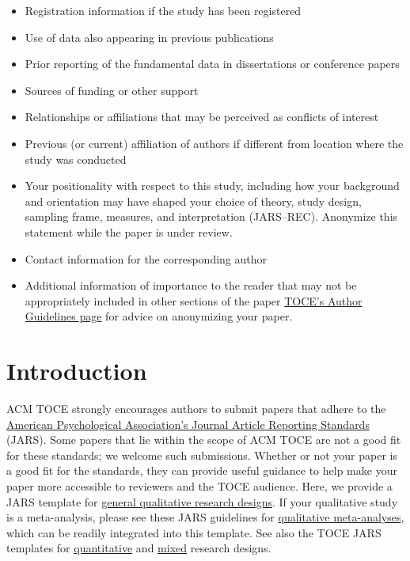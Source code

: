\documentclass[acmsmall,screen,anonymous,review]{acmart}
\begin{document}
\begin{itemize}
    \item Registration information if the study has been registered
    \item Use of data also appearing in previous publications
    \item Prior reporting of the fundamental data in dissertations or conference papers
    \item Sources of funding or other support
    \item Relationships or affiliations that may be perceived as conflicts of interest
    \item Previous (or current) affiliation of authors if different from location where the study  was conducted
    \item Your positionality with respect to this study, including how your background and orientation may have shaped your choice of theory, study design, sampling frame, measures, and interpretation (JARS--REC). Anonymize this statement while the paper is under review.
    \item Contact information for the corresponding author
    \item Additional information of importance to the reader that may not be appropriately included in other sections of the paper
    \href{https://dl.acm.org/journal/toce/author-guidelines}{TOCE’s Author Guidelines page} for advice on anonymizing your paper.
\end{itemize}

\section{Introduction}

ACM TOCE strongly encourages authors to submit papers that adhere to the \href{https://apastyle.apa.org/jars/}{American Psychological Association’s Journal Article Reporting Standards}  (JARS).  Some papers that lie within the scope of ACM TOCE are not a good fit for these standards; we welcome such submissions. Whether or not your paper is a good fit for the standards, they can provide useful guidance to help make your paper more accessible to reviewers and the TOCE audience.
Here, we provide a JARS template for \href{https://apastyle.apa.org/jars/qual-table-1.pdf}{general qualitative research designs}. If your qualitative study is a meta-analysis, please see these JARS guidelines for \href{https://apastyle.apa.org/jars/qual-table-2.pdf}{qualitative meta-analyses}, which can be readily integrated into this template. See also the TOCE JARS templates for \href{https://apastyle.apa.org/jars/quantitative}{quantitative} and \href{https://apastyle.apa.org/jars/mixed-methods}{mixed} research designs.
\end{document}
